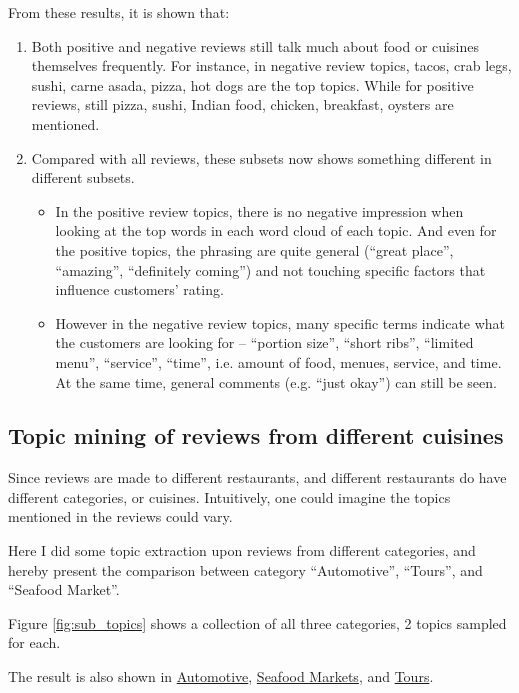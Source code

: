 \documentclass[11pt]{article}
\begin{document}
From these results, it is shown that:
\begin{enumerate}
  \item Both positive and negative reviews still talk much about food or cuisines themselves frequently. For instance, in negative review topics, tacos, crab legs, sushi, carne asada, pizza, hot dogs are the top topics. While for positive reviews, still pizza, sushi, Indian food, chicken, breakfast, oysters are mentioned.
  \item Compared with all reviews, these subsets now shows something different in different subsets.
    \begin{itemize}
      \item In the positive review topics, there is no negative impression when looking at the top words in each word cloud of each topic. And even for the positive topics, the phrasing are quite general (``great place'', ``amazing'', ``definitely coming'') and not touching specific factors that influence customers' rating.
      \item However in the negative review topics, many specific terms indicate what the customers are looking for -- ``portion size'', ``short ribs'', ``limited menu'', ``service'', ``time'', i.e. amount of food, menues, service, and time. At the same time, general comments (e.g. ``just okay'') can still be seen.
    \end{itemize}
\end{enumerate}


\subsection{Topic mining of reviews from different cuisines}
Since reviews are made to different restaurants, and different restaurants do have different categories, or cuisines. Intuitively, one could imagine the topics mentioned in the reviews could vary.

Here I did some topic extraction upon reviews from different categories, and hereby present the comparison between category ``Automotive'', ``Tours'', and ``Seafood Market''.

Figure \ref{fig:sub_topics} shows a collection of all three categories, 2 topics sampled for each.

The result is also shown in
\href{http://jiacheng-pan.me/standalone/datamining_capstone/task1/auto_reviews_topics.html}{Automotive},
\href{http://jiacheng-pan.me/standalone/datamining_capstone/task1/sea_reviews_topics.html}{Seafood Markets},
and 
\href{http://jiacheng-pan.me/standalone/datamining_capstone/task1/tour_reviews_topics.html}{Tours}.
\end{document}
